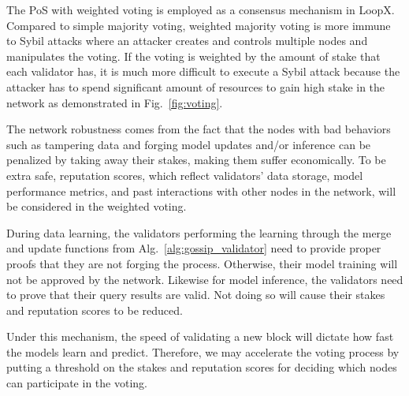 \documentclass[11pt,letterpaper]{article}
\begin{document}
The PoS with weighted voting is employed as a consensus mechanism in LoopX. Compared to simple majority voting, weighted majority voting is more immune to Sybil attacks where an attacker creates and controls multiple nodes and manipulates the voting. If the voting is weighted by the amount of stake that each validator has, it is much more difficult to execute a Sybil attack because the attacker has to spend significant amount of resources to gain high stake in the network as demonstrated in Fig.~\ref{fig:voting}.

The network robustness comes from the fact that the nodes with bad behaviors such as tampering data and forging model updates and/or inference can be penalized by taking away their stakes, making them suffer economically. To be extra safe, reputation scores, which reflect validators' data storage, model performance metrics, and past interactions with other nodes in the network, will be considered in the weighted voting.

During data learning, the validators performing the learning through the merge and update functions from Alg.~\ref{alg:gossip_validator} need to provide proper proofs that they are not forging the process. Otherwise, their model training will not be approved by the network. Likewise for model inference, the validators need to prove that their query results are valid. Not doing so will cause their stakes and reputation scores to be reduced.

Under this mechanism, the speed of validating a new block will dictate how fast the models learn and predict. Therefore, we may accelerate the voting process by putting a threshold on the stakes and reputation scores for deciding which nodes can participate in the voting.
\end{document}

